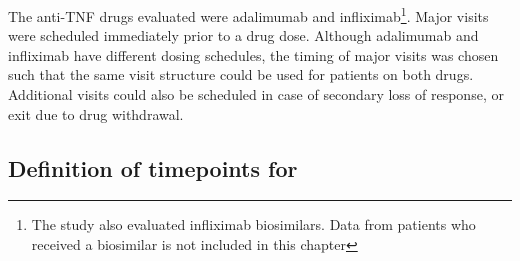 \begin{outline}
The \gls{anti-TNF} drugs evaluated were adalimumab and infliximab\footnote{The study also evaluated infliximab biosimilars. Data from patients who received a biosimilar is not included in this chapter}.
Major visits were scheduled immediately prior to a drug dose.
Although adalimumab and infliximab have different dosing schedules, the timing of major visits was chosen such that the same visit structure could be used for patients on both drugs.
Additional visits could also be scheduled in case of secondary loss of response, or exit due to drug withdrawal.

\subsection{Definition of timepoints for }


\end{outline}
